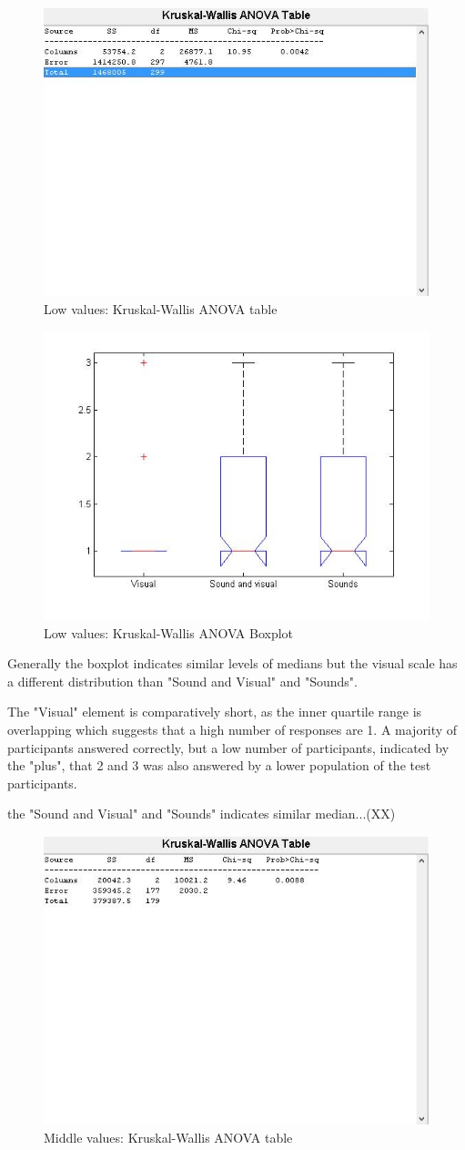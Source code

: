 \begin{figure}[!htbp]
    \centering
    \includegraphics[width=.5\textwidth]{images/tableLow.jpg}
    \caption{Low values: Kruskal-Wallis ANOVA table}
    \label{fig:tableLow}
\end{figure}

\begin{figure}[!htbp]
    \centering
    \includegraphics[width=.5\textwidth]{images/boxplotLow.jpg}
    \caption{Low values: Kruskal-Wallis ANOVA Boxplot}
    \label{fig:boxplotLow}
\end{figure}

Generally the boxplot indicates similar levels of medians but the visual scale has a different distribution than "Sound and Visual" and "Sounds".

The "Visual" element is comparatively short, as the inner quartile range is overlapping which suggests that a high number of responses are 1. A majority of participants answered correctly, but a low number of participants, indicated by the "plus", that 2 and 3 was also answered by a lower population of the test participants.

the "Sound and Visual" and "Sounds" indicates similar median...(XX)


\begin{figure}[!htbp]
    \centering
    \includegraphics[width=.5\textwidth]{images/tableMiddle.jpg}
    \caption{Middle values: Kruskal-Wallis ANOVA table}
    \label{fig:tableMiddle}
\end{figure}


